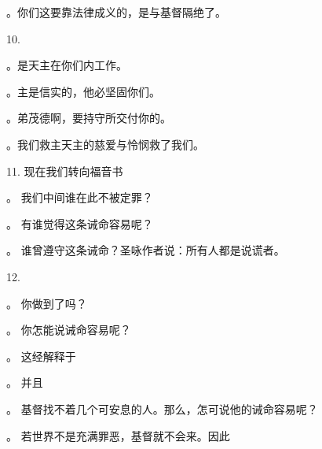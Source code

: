 。你们这要靠法律成义的，是与基督隔绝了。\par

10.\par

。是天主在你们内工作。\par

。主是信实的，他必坚固你们。\par

。弟茂德啊，要持守所交付你的。\par

。我们救主天主的慈爱与怜悯救了我们。\par

11. 现在我们转向福音书\par

。 我们中间谁在此不被定罪？\par

。 有谁觉得这条诫命容易呢？\par

。 谁曾遵守这条诫命？圣咏作者说：所有人都是说谎者。\par

12.\par

。 你做到了吗？\par

。 你怎能说诫命容易呢？\par

。 这经解释于\par

。 并且\par

。 基督找不着几个可安息的人。那么，怎可说他的诫命容易呢？\par

。  若世界不是充满罪恶，基督就不会来。因此\par

